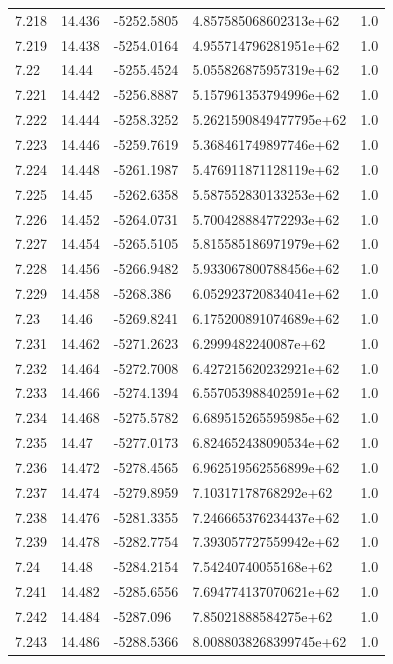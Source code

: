 \begin{tabular}{lllll}
7.218 & 14.436 & -5252.5805 & 4.857585068602313e+62 & 1.0 \\
7.219 & 14.438 & -5254.0164 & 4.955714796281951e+62 & 1.0 \\
7.22 & 14.44 & -5255.4524 & 5.055826875957319e+62 & 1.0 \\
7.221 & 14.442 & -5256.8887 & 5.157961353794996e+62 & 1.0 \\
7.222 & 14.444 & -5258.3252 & 5.2621590849477795e+62 & 1.0 \\
7.223 & 14.446 & -5259.7619 & 5.368461749897746e+62 & 1.0 \\
7.224 & 14.448 & -5261.1987 & 5.476911871128119e+62 & 1.0 \\
7.225 & 14.45 & -5262.6358 & 5.587552830133253e+62 & 1.0 \\
7.226 & 14.452 & -5264.0731 & 5.700428884772293e+62 & 1.0 \\
7.227 & 14.454 & -5265.5105 & 5.815585186971979e+62 & 1.0 \\
7.228 & 14.456 & -5266.9482 & 5.933067800788456e+62 & 1.0 \\
7.229 & 14.458 & -5268.386 & 6.052923720834041e+62 & 1.0 \\
7.23 & 14.46 & -5269.8241 & 6.175200891074689e+62 & 1.0 \\
7.231 & 14.462 & -5271.2623 & 6.2999482240087e+62 & 1.0 \\
7.232 & 14.464 & -5272.7008 & 6.427215620232921e+62 & 1.0 \\
7.233 & 14.466 & -5274.1394 & 6.557053988402591e+62 & 1.0 \\
7.234 & 14.468 & -5275.5782 & 6.689515265595985e+62 & 1.0 \\
7.235 & 14.47 & -5277.0173 & 6.824652438090534e+62 & 1.0 \\
7.236 & 14.472 & -5278.4565 & 6.962519562556899e+62 & 1.0 \\
7.237 & 14.474 & -5279.8959 & 7.10317178768292e+62 & 1.0 \\
7.238 & 14.476 & -5281.3355 & 7.246665376234437e+62 & 1.0 \\
7.239 & 14.478 & -5282.7754 & 7.393057727559942e+62 & 1.0 \\
7.24 & 14.48 & -5284.2154 & 7.54240740055168e+62 & 1.0 \\
7.241 & 14.482 & -5285.6556 & 7.694774137070621e+62 & 1.0 \\
7.242 & 14.484 & -5287.096 & 7.85021888584275e+62 & 1.0 \\
7.243 & 14.486 & -5288.5366 & 8.0088038268399745e+62 & 1.0 \\

\end{tabular}
